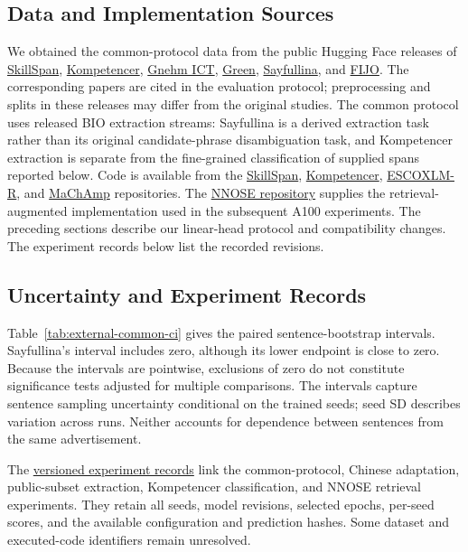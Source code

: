 \subsection{Data and Implementation Sources}
We obtained the common-protocol data from the public Hugging Face releases of
\href{https://huggingface.co/datasets/jjzha/skillspan}{SkillSpan},
\href{https://huggingface.co/datasets/jjzha/kompetencer}{Kompetencer},
\href{https://huggingface.co/datasets/jjzha/gnehm}{Gnehm ICT},
\href{https://huggingface.co/datasets/jjzha/green}{Green},
\href{https://huggingface.co/datasets/jjzha/sayfullina}{Sayfullina}, and
\href{https://huggingface.co/datasets/jjzha/fijo}{FIJO}.
The corresponding papers are cited in the evaluation protocol; preprocessing and splits in these releases may differ from the original studies. The common protocol uses released BIO extraction streams: Sayfullina is a derived extraction task rather than its original candidate-phrase disambiguation task, and Kompetencer extraction is separate from the fine-grained classification of supplied spans reported below. Code is available from the
\href{https://github.com/kris927b/SkillSpan}{SkillSpan},
\href{https://github.com/jjzha/kompetencer}{Kompetencer},
\href{https://github.com/mainlp/escoxlmr}{ESCOXLM-R}, and
\href{https://github.com/machamp-nlp/machamp}{MaChAmp} repositories.
The \href{https://github.com/jjzha/nnose}{NNOSE repository} supplies the retrieval-augmented implementation used in the subsequent A100 experiments.
The preceding sections describe our linear-head protocol and compatibility changes. The experiment records below list the recorded revisions.

\subsection{Uncertainty and Experiment Records}
Table~\ref{tab:external-common-ci} gives the paired sentence-bootstrap intervals. Sayfullina's interval includes zero, although its lower endpoint is close to zero. Because the intervals are pointwise, exclusions of zero do not constitute significance tests adjusted for multiple comparisons. The intervals capture sentence sampling uncertainty conditional on the trained seeds; seed SD describes variation across runs. Neither accounts for dependence between sentences from the same advertisement.

The \href{https://github.com/AlfredJamesLi/chinese-skillspan-benchmark/blob/36f009fab01b8433355cb7ef5af8fad02c6cc519/reproduction/process_archive_20260924/README.md}{versioned experiment records} link the common-protocol, Chinese adaptation, public-subset extraction, Kompetencer classification, and NNOSE retrieval experiments. They retain all seeds, model revisions, selected epochs, per-seed scores, and the available configuration and prediction hashes. Some dataset and executed-code identifiers remain unresolved.

